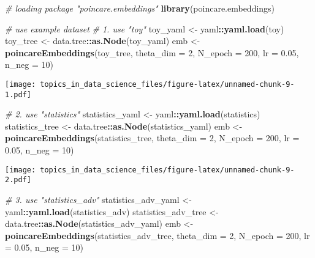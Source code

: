 \documentclass[
  11pt,
]{book}
\newenvironment{Shaded}{\begin{snugshade}}{\end{snugshade}}
\newcommand{\CommentTok}[1]{\textcolor[rgb]{0.56,0.35,0.01}{\textit{#1}}}
\newcommand{\DataTypeTok}[1]{\textcolor[rgb]{0.13,0.29,0.53}{#1}}
\newcommand{\DecValTok}[1]{\textcolor[rgb]{0.00,0.00,0.81}{#1}}
\newcommand{\FloatTok}[1]{\textcolor[rgb]{0.00,0.00,0.81}{#1}}
\newcommand{\KeywordTok}[1]{\textcolor[rgb]{0.13,0.29,0.53}{\textbf{#1}}}
\newcommand{\NormalTok}[1]{#1}
\newcommand{\OperatorTok}[1]{\textcolor[rgb]{0.81,0.36,0.00}{\textbf{#1}}}
\newcommand{\StringTok}[1]{\textcolor[rgb]{0.31,0.60,0.02}{#1}}
\begin{document}
\begin{Shaded}
\begin{Highlighting}[]
\CommentTok{# loading package "poincare.embeddings"}
\KeywordTok{library}\NormalTok{(poincare.embeddings)}

\CommentTok{# use example dataset}
\CommentTok{# 1. use "toy"}
\NormalTok{toy_yaml <-}\StringTok{ }\NormalTok{yaml}\OperatorTok{::}\KeywordTok{yaml.load}\NormalTok{(toy)}
\NormalTok{toy_tree <-}\StringTok{ }\NormalTok{data.tree}\OperatorTok{::}\KeywordTok{as.Node}\NormalTok{(toy_yaml)}
\NormalTok{emb <-}\StringTok{ }\KeywordTok{poincareEmbeddings}\NormalTok{(toy_tree, }\DataTypeTok{theta_dim =} \DecValTok{2}\NormalTok{, }\DataTypeTok{N_epoch =} \DecValTok{200}\NormalTok{, }\DataTypeTok{lr =} \FloatTok{0.05}\NormalTok{, }\DataTypeTok{n_neg =} \DecValTok{10}\NormalTok{)}
\end{Highlighting}
\end{Shaded}

\texttt{[image: topics\_in\_data\_science\_files/figure-latex/unnamed-chunk-9-1.pdf]}

\begin{Shaded}
\begin{Highlighting}[]
\CommentTok{# 2. use "statistics"}
\NormalTok{statistics_yaml <-}\StringTok{ }\NormalTok{yaml}\OperatorTok{::}\KeywordTok{yaml.load}\NormalTok{(statistics)}
\NormalTok{statistics_tree <-}\StringTok{ }\NormalTok{data.tree}\OperatorTok{::}\KeywordTok{as.Node}\NormalTok{(statistics_yaml)}
\NormalTok{emb <-}\StringTok{ }\KeywordTok{poincareEmbeddings}\NormalTok{(statistics_tree, }\DataTypeTok{theta_dim =} \DecValTok{2}\NormalTok{, }\DataTypeTok{N_epoch =} \DecValTok{200}\NormalTok{, }\DataTypeTok{lr =} \FloatTok{0.05}\NormalTok{, }\DataTypeTok{n_neg =} \DecValTok{10}\NormalTok{)}
\end{Highlighting}
\end{Shaded}

\texttt{[image: topics\_in\_data\_science\_files/figure-latex/unnamed-chunk-9-2.pdf]}

\begin{Shaded}
\begin{Highlighting}[]
\CommentTok{# 3. use "statistics_adv"}
\NormalTok{statistics_adv_yaml <-}\StringTok{ }\NormalTok{yaml}\OperatorTok{::}\KeywordTok{yaml.load}\NormalTok{(statistics_adv)}
\NormalTok{statistics_adv_tree <-}\StringTok{ }\NormalTok{data.tree}\OperatorTok{::}\KeywordTok{as.Node}\NormalTok{(statistics_adv_yaml)}
\NormalTok{emb <-}\StringTok{ }\KeywordTok{poincareEmbeddings}\NormalTok{(statistics_adv_tree, }\DataTypeTok{theta_dim =} \DecValTok{2}\NormalTok{, }\DataTypeTok{N_epoch =} \DecValTok{200}\NormalTok{, }\DataTypeTok{lr =} \FloatTok{0.05}\NormalTok{, }\DataTypeTok{n_neg =} \DecValTok{10}\NormalTok{)}
\end{Highlighting}
\end{Shaded}
\end{document}
